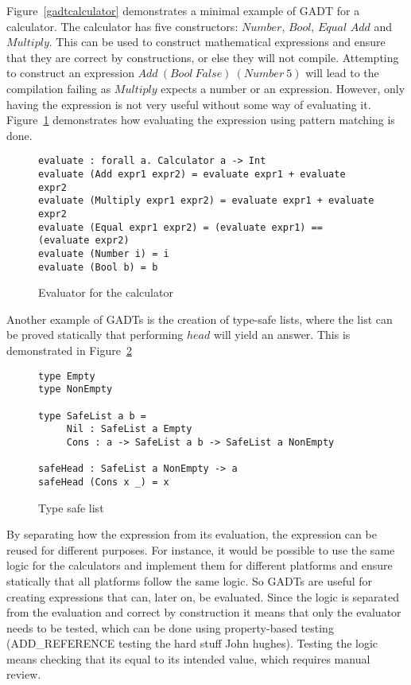 Figure~\ref{gadtcalculator} demonstrates a minimal example of GADT for a
calculator. The calculator has five constructors: $Number$, $Bool$, $Equal$
$Add$ and $Multiply$. This can be used to construct mathematical expressions and
ensure that they are correct by constructions, or else they will not compile.
Attempting to construct an expression $Add\ (Bool\ False)\ (Number\ 5)$ will
lead to the compilation failing as $Multiply$ expects a number or an expression.
However, only having the expression is not very useful without some way of
evaluating it.  Figure~\ref{calculator} demonstrates how evaluating the
expression using pattern matching is done.

\begin{figure}[H]
    \begin{lstlisting}
evaluate : forall a. Calculator a -> Int
evaluate (Add expr1 expr2) = evaluate expr1 + evaluate expr2
evaluate (Multiply expr1 expr2) = evaluate expr1 + evaluate expr2
evaluate (Equal expr1 expr2) = (evaluate expr1) == (evaluate expr2)
evaluate (Number i) = i
evaluate (Bool b) = b
    \end{lstlisting}
    \caption{Evaluator for the calculator}
    \label{calculator}
\end{figure}

Another example of GADTs is the creation of type-safe lists, where the list can
be proved statically that performing $head$ will yield an answer. This is
demonstrated in Figure~\ref{safelist}

\begin{figure}[H]
    \begin{lstlisting}
type Empty
type NonEmpty

type SafeList a b =
     Nil : SafeList a Empty
     Cons : a -> SafeList a b -> SafeList a NonEmpty

safeHead : SafeList a NonEmpty -> a
safeHead (Cons x _) = x
    \end{lstlisting}
    \caption{Type safe list}
    \label{safelist}
\end{figure}

By separating how the expression from its evaluation, the expression can be
reused for different purposes. For instance, it would be possible to use the
same logic for the calculators and implement them for different platforms and
ensure statically that all platforms follow the same logic. So GADTs are useful
for creating expressions that can, later on, be evaluated.  Since the logic is
separated from the evaluation and correct by construction it means that only the
evaluator needs to be tested, which can be done using property-based testing
(ADD\_REFERENCE testing the hard stuff John hughes). Testing the logic means
checking that its equal to its intended value, which requires manual review.

